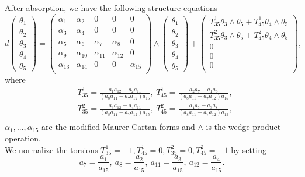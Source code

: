 \documentclass[12pt]{article}
\begin{document}
After absorption, we have the following structure equations
\begin{equation}
d\begin{pmatrix}
\theta_1\\
\theta_2\\
\theta_3\\
\theta_4\\
\theta_5
\end{pmatrix}
=\begin{pmatrix}
\alpha_1&\alpha_2&0&0&0\\
\alpha_3&\alpha_4&0&0&0\\
\alpha_5&\alpha_6&\alpha_7&\alpha_8&0\\
\alpha_9&\alpha_{10}&\alpha_{11}&\alpha_{12}&0\\
\alpha_{13}&\alpha_{14}&0&0&\alpha_{15}\\
\end{pmatrix}\wedge
\begin{pmatrix}
\theta_1\\
\theta_2\\
\theta_3\\
\theta_4\\
\theta_5
\end{pmatrix}+\begin{pmatrix}
T^1_{35}\theta_3\wedge\theta_5+T^1_{45}\theta_4\wedge\theta_5\\
T^2_{35}\theta_3\wedge\theta_5+T^2_{45}\theta_4\wedge\theta_5\\
0\\
0\\
0\\
\end{pmatrix},
\end{equation}
where
\begin{equation}
\begin{aligned}
&T^1_{35}=\frac{a_1a_{12}-a_2a_{11}}{(a_8a_{11}-a_7a_{12})a_{15}},~T^1_{45}=\frac{a_2a_{7}-a_1a_{8}}{(a_8a_{11}-a_7a_{12})a_{15}},\\
&T^2_{35}=\frac{a_3a_{12}-a_4a_{11}}{(a_8a_{11}-a_7a_{12})a_{15}},~T^2_{45}=\frac{a_4a_{7}-a_3a_{8}}{(a_8a_{11}-a_7a_{12})a_{15}},\\
\end{aligned}
\end{equation}
 $\alpha_1,...,\alpha_{15}$ are the modified Maurer-Cartan forms and $\wedge$ is the wedge product operation.\\
 
We normalize the torsions $T^1_{35}=-1, T^1_{45}=0,  T^2_{35}=0, T^2_{45}=-1$ by setting
\begin{equation}
a_7=\frac{a_1}{a_{15}},~a_8=\frac{a_2}{a_{15}},~a_{11}=\frac{a_3}{a_{15}},~a_{12}=\frac{a_4}{a_{15}}.
\end{equation} 
\end{document}
